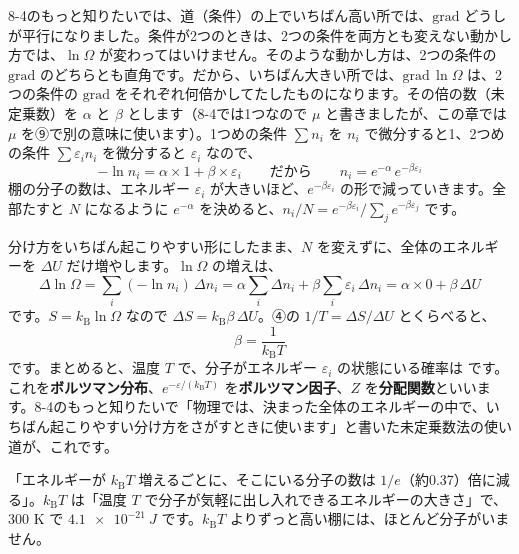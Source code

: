 8-4のもっと知りたいでは、道（条件）の上でいちばん高い所では、$\mathrm{grad}$ どうしが平行になりました。条件が2つのときは、2つの条件を両方とも変えない動かし方では、$\ln\Omega$ が変わってはいけません。そのような動かし方は、2つの条件の $\mathrm{grad}$ のどちらとも直角です。だから、いちばん大きい所では、$\mathrm{grad}\,\ln\Omega$ は、2つの条件の $\mathrm{grad}$ をそれぞれ何倍かしてたしたものになります。その倍の数（未定乗数）を $\alpha$ と $\beta$ とします（8-4では1つなので $\mu$ と書きましたが、この章では $\mu$ を⑨で別の意味に使います）。1つめの条件 $\sum n_i$ を $n_i$ で微分すると1、2つめの条件 $\sum\varepsilon_in_i$ を微分すると $\varepsilon_i$ なので、
\[-\ln n_i=\alpha\times1+\beta\times\varepsilon_i\qquad\text{だから}\qquad n_i=e^{-\alpha}\,e^{-\beta\varepsilon_i}\]
棚の分子の数は、エネルギー $\varepsilon_i$ が大きいほど、$e^{-\beta\varepsilon_i}$ の形で減っていきます。全部たすと $N$ になるように $e^{-\alpha}$ を決めると、$n_i/N=e^{-\beta\varepsilon_i}\big/\sum_je^{-\beta\varepsilon_j}$ です。

分け方をいちばん起こりやすい形にしたまま、$N$ を変えずに、全体のエネルギーを $\Delta U$ だけ増やします。$\ln\Omega$ の増えは、
\[\Delta\ln\Omega=\sum_i(-\ln n_i)\,\Delta n_i=\alpha\sum_i\Delta n_i+\beta\sum_i\varepsilon_i\,\Delta n_i=\alpha\times0+\beta\,\Delta U\]
です。$S=k_{\mathrm B}\ln\Omega$ なので $\Delta S=k_{\mathrm B}\beta\,\Delta U$。④の $1/T=\Delta S/\Delta U$ とくらべると、
\[\beta=\frac{1}{k_{\mathrm B}T}\]
です。まとめると、温度 $T$ で、分子がエネルギー $\varepsilon_i$ の状態にいる確率は
\label{ph:熱-15:bunpu}です。これを\textbf{ボルツマン分布}、$e^{-\varepsilon/(k_{\mathrm B}T)}$ を\textbf{ボルツマン因子}、$Z$ を\textbf{分配関数}といいます。8-4のもっと知りたいで「物理では、決まった全体のエネルギーの中で、いちばん起こりやすい分け方をさがすときに使います」と書いた未定乗数法の使い道が、これです。

\begin{phyomi}
「エネルギーが $k_{\mathrm B}T$ 増えるごとに、そこにいる分子の数は $1/e$（約0.37）倍に減る」。$k_{\mathrm B}T$ は「温度 $T$ で分子が気軽に出し入れできるエネルギーの大きさ」で、300 K で $\qty{4.1e-21}{J}$ です。$k_{\mathrm B}T$ よりずっと高い棚には、ほとんど分子がいません。
\end{phyomi}

